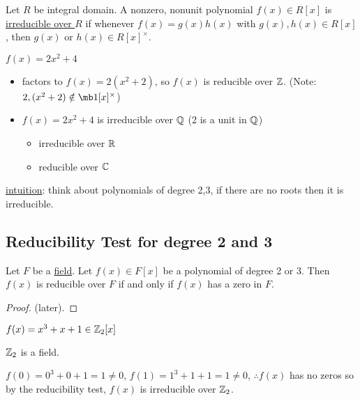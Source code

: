 \documentclass[]{article}
\begin{document}
\begin{definition}
	Let $R$ be integral domain. A nonzero, nonunit polynomial $f(x)\in R[x]$ is \ul{irreducible over $R$} if whenever $f(x)=g(x)h(x)$ with $g(x),h(x)\in R[x]$, then $g(x)$ or $h(x)\in R[x]^\times$.
\end{definition}
\begin{example}
	$f(x)=2x^2+4$
	\begin{itemize}
		\item factors to $f(x)=2(x^2+2)$, so $f(x)$ is reducible over $\mathbb{Z}$.
			(Note: $2,(x^2+2)\notin\mb 1[x]^\times$)
		\item $f(x)=2x^2+4$ is irreducible over $\mathbb{Q}$ (2 is a unit in $\mathbb{Q}$)
			\begin{itemize}
				\item irreducible over $\mathbb{R}$
				\item reducible over $\mathbb{C}$
			\end{itemize}
	\end{itemize}
\end{example}
\ul{intuition}: think about polynomials of degree 2,3, if there are no roots then it is irreducible.

\subsection*{Reducibility Test for degree 2 and 3}
Let $F$ be a \ul{field}. Let $f(x)\in F[x]$ be a polynomial of degree 2 or 3.
Then $f(x)$ is reducible over $F$ if and only if $f(x)$ has a zero in $F$.
\begin{proof}
	(later).
\end{proof}
\begin{example}
	$f(x)=x^3+x+1\in\mathbb{Z}_2[x]$
	\begin{note}
		$\mathbb{Z}_2$ is a field.
	\end{note}
	$f(0)=0^3+0+1=1\neq0$, $f(1)=1^3+1+1=1\neq0$, $\therefore f(x)$ has no zeros so by the reducibility test, $f(x)$ is irreducible over $\mathbb{Z}_2$.
\end{example}
\end{document}
